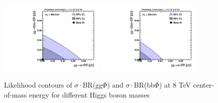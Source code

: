 \begin{figure}[!h]
\begin{center}
 \includegraphics[width=0.45\textwidth]{MSSM/PLOTS/cmb-ggH-bbH-scan-GGH-BBH-450.pdf}
 \includegraphics[width=0.45\textwidth]{MSSM/PLOTS/cmb-ggH-bbH-scan-GGH-BBH-500.pdf}
 \caption{Likelihood contours of $\sigma\cdot$BR(gg$\Phi$) and $\sigma\cdot$BR(bb$\Phi$) at 8 TeV center-of-mass energy for different Higgs boson masses}
  \label{fig:contour3}\end{center}\end{figure}


